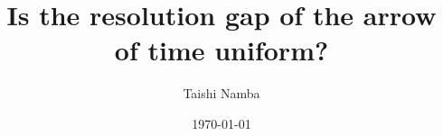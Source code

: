 \documentclass[aps,pre,reprint,twocolumn,nofootinbib,superscriptaddress]{revtex4-2}
\theoremstyle{remark}
\begin{document}
\title{Is the resolution gap of the arrow of time uniform?}

\author{Taishi Namba}

\date{\today}



\maketitle









\appendix







\end{document}
